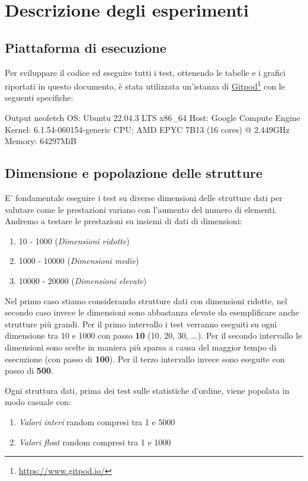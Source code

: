 \documentclass[onecolumn]{article}
\newcommand\anchor[2]{%
  \href{#2}{#1}\footnote{\url{#2}}%
}
\begin{document}
\section{Descrizione degli esperimenti}
\subsection{Piattaforma di esecuzione}

Per sviluppare il codice ed eseguire tutti i test, ottenendo le tabelle e i grafici riportati in questo documento, è stata utilizzata un'istanza di \anchor{Gitpod}{https://www.gitpod.io/} con le seguenti specifiche:
\begin{bashCode}{Output neofetch}
	OS: Ubuntu 22.04.3 LTS x86_64 
	Host: Google Compute Engine 
	Kernel: 6.1.54-060154-generic 
	CPU: AMD EPYC 7B13 (16 cores) @ 2.449GHz 
	Memory: 64297MiB
\end{bashCode}

\subsection{Dimensione e popolazione delle strutture}

E' fondamentale eseguire i test su diverse dimensioni delle strutture dati per valutare come le prestazioni variano con l'aumento del numero di elementi. Andremo a testare le prestazioni su insiemi di dati di dimensioni:
\begin{enumerate}
	\setlength\itemsep{-0.25em}
	\item 10 - 1000 (\textit{Dimensioni ridotte})
	\item 1000 - 10000 (\textit{Dimensioni medie})
	\item 10000 - 20000 (\textit{Dimensioni elevate})
\end{enumerate}

Nel primo caso stiamo considerando strutture dati con dimensioni ridotte, nel secondo caso invece le dimensioni sono abbastanza elevate da esemplificare anche strutture più grandi. Per il primo intervallo i test verranno eseguiti su ogni dimensione tra 10 e 1000 con passo \textbf{10} (10, 20, 30, ...). Per il secondo intervallo le dimensioni sono scelte in maniera più sparsa a causa del maggior tempo di esecuzione (con passo di \textbf{100}). Per il terzo intervallo invece sono eseguite con passo di \textbf{500}. \vspace{1em}

Ogni struttura dati, prima dei test sulle statistiche d'ordine, viene popolata in modo casuale con:
\begin{enumerate}
	\setlength\itemsep{-0.25em}
	\item \textit{Valori interi} random compresi tra 1 e 5000
	\item \textit{Valori float} random compresi tra 1 e 1000
\end{enumerate}
\end{document}
